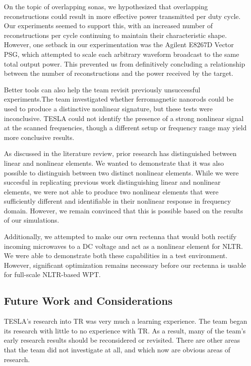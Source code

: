 On the topic of overlapping sonas, we hypothesized that overlapping reconstructions could result in more effective power transmitted per duty cycle. Our experiments seemed to support this, with an increased number of reconstructions per cycle continuing to maintain their characteristic shape. However, one setback in our experimentation was the Agilent E8267D Vector PSG, which attempted to scale each arbitrary waveform  broadcast to the same total output power. This prevented us from definitively concluding a relationship between the number of reconstructions and the power received by the target.

Better tools can also help the team revisit previously unsuccessful experiments.The team investigated whether ferromagnetic nanorods could be used to produce a distinctive nonlinear signature, but these tests were inconclusive. TESLA could not identify the presence of a strong nonlinear signal at the scanned frequencies, though a different setup or frequency range may yield more conclusive results. 

As discussed in the literature review, prior research has distinguished between linear and nonlinear elements. We wanted to demonstrate that it was also possible to distinguish between two distinct nonlinear elements. While we were succesful in replicating previous work distinguishing linear and nonlinear elements, we were not able to produce two nonlinear elements that were sufficiently different and identifiable in their nonlinear response in frequency domain. However, we remain convinced that this is possible based on the results of our simulations.

Additionally, we attempted to make our own rectenna that would both rectify incoming microwaves to a DC voltage and act as a nonlinear element for NLTR. We were able to demonstrate both these capabilities in a test environment. However, significant optimization remains necessary before our rectenna is usable for full-scale NLTR-based WPT.


\subsection{Future Work and Considerations}

TESLA's research into TR was very much a learning experience.  The team began its research with little to no experience with TR.  As a result, many of the team's early research results should be reconsidered or revisited. There are other areas that the team did not investigate at all, and which now are obvious areas of research.

